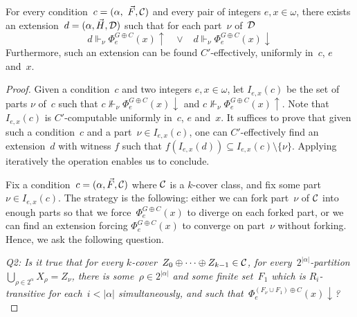 \begin{lemma}\label{lem:em-comp-reduc-force-dense}
For every condition~$c = (\alpha, \vec{F}, \Ccal)$ and every pair of integers $e, x \in \omega$,
there exists an extension~$d = (\alpha, \vec{H}, \mathcal{D})$ such that for each part~$\nu$ of~$\mathcal{D}$
$$
d \Vdash_\nu \Phi_e^{G \oplus C}(x) \uparrow \hspace{10pt} \vee \hspace{10pt} d \Vdash_\nu \Phi_e^{G \oplus C}(x) \downarrow
$$
Furthermore, such an extension can be found $C'$-effectively, uniformly in~$c$, $e$ and~$x$.
\end{lemma}
\begin{proof}
Given a condition~$c$ and two integers $e, x \in \omega$,
let $I_{e,x}(c)$ be the set of parts $\nu$ of~$c$
such that $c \not \Vdash_\nu \Phi_e^{G \oplus C}(x) \downarrow$ and $c \not \Vdash_\nu \Phi_e^{G \oplus C}(x) \uparrow$.
Note that $I_{e,x}(c)$ is $C'$-computable uniformly in~$c$, $e$ and~$x$.
It suffices to prove that given such a condition~$c$ and a part~$\nu \in I_{e,x}(c)$, one can $C'$-effectively
find an extension~$d$ with witness $f$ such that $f(I_{e,x}(d)) \subseteq I_{e,x}(c) \setminus \{\nu\}$.
Applying iteratively the operation enables us to conclude.

Fix a condition~$c = (\alpha, \vec{F}, \Ccal)$ where $\mathcal{C}$ is a $k$-cover class, and fix some part~$\nu \in I_{e,x}(c)$.
The strategy is the following: either we can fork part~$\nu$ of $\mathcal{C}$ into enough parts so that we 
force~$\Phi_e^{G \oplus C}(x)$ to diverge
on each forked part, or we can find an extension forcing $\Phi_e^{G \oplus C}(x)$ to converge on part~$\nu$ without forking.
Hence, we ask the following question.

\smallskip
{\itshape
Q2: Is it true that for every $k$-cover~$Z_0 \oplus \dots \oplus Z_{k-1} \in \mathcal{C}$,
for every~$2^{|\alpha|}$-partition $\bigcup_{\rho \in 2^\alpha} X_\rho = Z_\nu$,
there is some~$\rho \in 2^{|\alpha|}$ and some finite set~$F_1$ which is $R_i$-transitive
for each~$i < |\alpha|$ simultaneously, and such that~$\Phi_e^{(F_\nu \cup F_1) \oplus C}(x) \downarrow$?
}
\smallskip


\end{proof}
